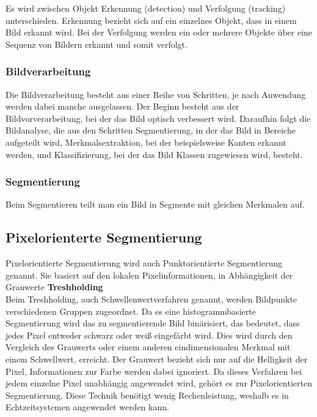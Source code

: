     Es wird zwischen Objekt Erkennung (detection) und Verfolgung (tracking) unterschieden. Erkennung bezieht sich auf ein einzelnes Objekt, dass in einem Bild erkannt wird. Bei der Verfolgung werden ein oder mehrere Objekte über eine Sequenz von Bildern erkannt und somit verfolgt.
    \cite{obj_det_trak}

    \subsubsection{Bildverarbeitung} 
    Die Bildverarbeitung besteht aus einer Reihe von Schritten, je nach Anwendung werden dabei manche ausgelassen.
    Der Beginn besteht aus der Bildvorverarbeitung, bei der das Bild optisch verbessert wird. Daraufhin folgt die Bildanalyse, die aus den Schritten Segmentierung, in der das Bild in Bereiche aufgeteilt wird, Merkmalsextraktion, bei der beispielsweise Kanten erkannt werden, und Klassifizierung, bei der das Bild Klassen zugewiesen wird, besteht. \cite{Bildverarbeitung} \cite{Bildverarbeitung2}

    \subsubsection{Segmentierung}
    Beim Segmentieren teilt man ein Bild in Segmente mit gleichen Merkmalen auf.

    \subsection*{Pixelorienterte Segmentierung} 
    Pixelorientierte Segmentierung wird auch Punktorientierte Segmentierung genannt. Sie basiert auf den lokalen Pixelinformationen, in Abhängigkeit der Grauwerte \cite{Seg_punkt}
    \textbf{Treshholding}\\ 
    Beim Treshholding, auch Schwellenwertverfahren genannt, werden Bildpunkte verschiedenen Gruppen zugeordnet. Da es eine histogrammbasierte Segmentierung wird das zu segmentierende Bild binärisiert, das bedeutet, dass jedes Pixel entweder schwarz oder weiß eingefärbt wird. Dies wird durch den Vergleich des Grauwerts oder einem anderen eindimensionalen Merkmal mit einem Schwellwert, erreicht. Der Grauwert bezieht sich nur auf die Helligkeit der Pixel, Informationen zur Farbe werden dabei ignoriert. Da dieses Verfahren bei jedem einzelne Pixel unabhängig angewendet wird, gehört es zur Pixelorientierten Segmentierung. Diese Technik benötigt wenig Rechenleistung, weshalb es in Echtzeitsystemen angewendet werden kann.

